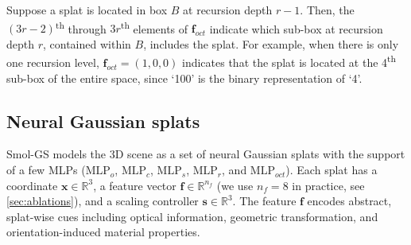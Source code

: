 \documentclass{article}
\def\vf{{\bm{f}}}
\def\vs{{\bm{s}}}
\def\vx{{\bm{x}}}
\newcommand{\ours}{Smol-GS\xspace}
\newcommand{\MLP}{\mathrm{MLP}}
\begin{document}
Suppose a splat is located in box $B$ at recursion depth $r-1$. Then, the $(3r-2)$\textsuperscript{th} through $3r$\textsuperscript{th} elements of $\vf_{oct}$ indicate which sub-box at recursion depth $r$, contained within $B$, includes the splat. For example, when there is only one recursion level, $\vf_{oct} = (1, 0, 0)$ indicates that the splat is located at the 4\textsuperscript{th} sub-box of the entire space, since `100' is the binary representation of `4'.



\subsection{Neural Gaussian splats}
\label{sec:neural_splats}
%
\ours models the 3D scene as a set of neural Gaussian splats with the support of a few MLPs ($\MLP_{o}$, $\MLP_{c}$, $\MLP_{s}$, $\MLP_{r}$, and $\MLP_{oct}$). Each splat has a coordinate $\vx\in\mathbb{R}^3$, a feature vector $\vf\in\mathbb{R}^{n_f}$ (we use $n_f = 8$ in practice, see \cref{sec:ablations}), and a scaling controller $\vs\in\mathbb{R}^3$. The feature $\vf$ encodes abstract, splat-wise cues including optical information, geometric transformation, and orientation-induced material properties.
%
%
\end{document}
